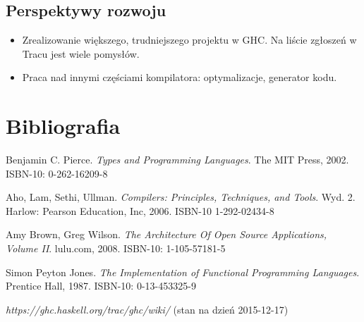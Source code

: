 \documentclass[polish]{beamer}
\makeatletter
\newcommand*{\currentname}{\@currentlabelname}
\makeatother
\begin{document}
\subsection{Perspektywy rozwoju} %
\begin{tframe}{\currentname}
    \begin{itemize}
        \item Zrealizowanie większego, trudniejszego projektu w GHC. Na liście zgłoszeń w Tracu jest wiele pomysłów. 
        \item Praca nad innymi częściami kompilatora: optymalizacje, generator kodu.
    \end{itemize}
\end{tframe}

\section{Bibliografia} %
\begin{tframe}{\currentname}
    \begin{thebibliography}{9}
        \small

         Benjamin C. Pierce. \emph{Types and Programming Languages}. The MIT Press, 2002. ISBN-10: 0-262-16209-8

         Aho, Lam, Sethi, Ullman. \emph{Compilers: Principles, Techniques, and Tools}. Wyd. 2. Harlow: Pearson Education, Inc, 2006. ISBN-10 1-292-02434-8

         Amy Brown, Greg Wilson. \emph{The Architecture Of Open Source Applications, Volume II}.  lulu.com, 2008. ISBN-10: 1-105-57181-5

         Simon Peyton Jones. \emph{The Implementation of Functional Programming Languages}. Prentice Hall, 1987. ISBN-10: 0-13-453325-9

         \emph{https://ghc.haskell.org/trac/ghc/wiki/} (stan na dzień 2015-12-17)



    \end{thebibliography}
\end{tframe}
\end{document}

